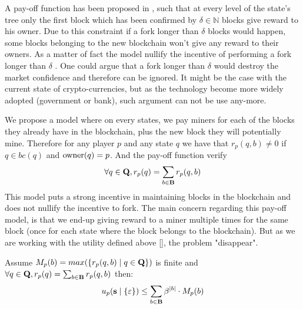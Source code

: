 A pay-off function has been proposed in \cite{}, such that at every level of the state's tree only the first block which has been confirmed by $\delta \in \mathbb{N}$ blocks give reward to his owner. Due to this constraint if a fork longer than $\delta$ blocks would happen, some blocks belonging to the new blockchain won't give any reward to their owners. As a matter of fact the model nullify the incentive of performing a fork longer than $\delta$ \cite{}. One could argue that a fork longer than $\delta$ would destroy the market confidence and therefore can be ignored. It might be the case with the current state of crypto-currencies, but as the technology become more widely adopted (government or bank), such argument can not be use any-more.

We propose a model where on every states, we pay miners for each of the blocks they already have in the blockchain, plus the new block they will potentially mine. Therefore for any player $p$ and any state $q$ we have that $r_p(q,b) \neq 0$ if $q \in bc(q)$ and $\text{\rm owner}(q) = p$. And the pay-off function verify\begin{equation*}
\forall q \in \mathbf{Q}, r_p(q)= \sum_{b \in \text{\bf B}} r_p(q,b)
\end{equation*} 
This model puts a strong incentive in maintaining blocks in the blockchain and does not nullify the incentive to fork. The main concern regarding this pay-off model, is that we end-up giving reward to a miner multiple times for the same block (once for each state where the block belongs to the blockchain). But as we are working with the utility defined above \ref{}, the problem "disappear".

\begin{myprop}\label{prop:bound}
Assume $M_p(b) = max(\{r_p(q,b) \mid q \in \mathbf{Q} \})$ is finite and $\forall q \in \mathbf{Q}, r_p(q) = \sum_{b \in \text{\bf B}} r_p(q,b)$ then:
\begin{equation*}
u_p(\mathbf{s} \mid \{\varepsilon\}) \leq   \sum_{b \in \mathbf{B}} \beta^{|b|} \cdot M_p(b)
\end{equation*}
\end{myprop}

